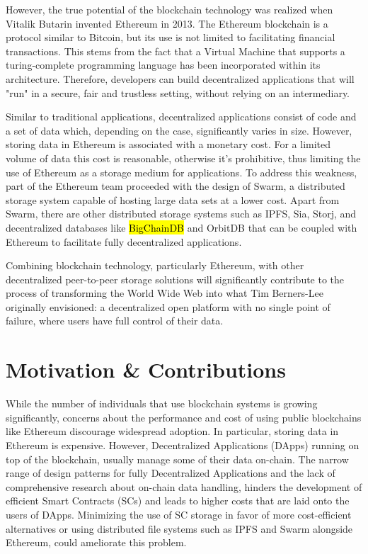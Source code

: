 However, the true potential of the blockchain technology was realized when Vitalik Butarin invented Ethereum in 2013. The Ethereum blockchain is a protocol similar to Bitcoin, but its use is not limited to facilitating financial transactions. This stems from the fact that a Virtual Machine that supports a turing-complete programming language has been incorporated within its architecture. Therefore, developers can build decentralized applications that will "run" in a secure, fair and trustless setting, without relying on an intermediary. 

Similar to traditional applications, decentralized applications consist of code and a set of data which, depending on the case, significantly varies in size. However, storing data in Ethereum is associated with a monetary cost. For a limited volume of data this cost is reasonable, otherwise it's prohibitive, thus limiting the use of Ethereum as a storage medium for applications. To address this weakness, part of the Ethereum team proceeded with the design of Swarm, a distributed storage system capable of hosting large data sets at a lower cost. Apart from Swarm, there are other distributed storage systems such as IPFS, Sia, Storj, and decentralized databases like \hl{BigChainDB} and OrbitDB that can be coupled with Ethereum to facilitate fully decentralized applications. 

Combining blockchain technology, particularly Ethereum, with other decentralized peer-to-peer storage solutions will significantly contribute to the process of transforming the World Wide Web into what Tim Berners-Lee originally envisioned: a decentralized open platform with no single point of failure, where users have full control of their data. 

\section{Motivation \& Contributions}\label{sec:}
While the number of individuals that use blockchain systems is growing significantly, concerns about the performance and cost of using public blockchains like Ethereum \citep{buterin_2014} discourage widespread adoption. In particular, storing data in Ethereum is expensive. However, Decentralized Applications (DApps) running on top of the blockchain, usually manage some of their data on-chain. The narrow range of design patterns for fully Decentralized Applications \citep{wohrer_2021} and the lack of comprehensive research about on-chain data handling, hinders the development of efficient Smart Contracts (SCs) and leads to higher costs that are laid onto the users of DApps. Minimizing the use of SC storage in favor of more cost-efficient alternatives or using distributed file systems such as IPFS \citep{benet_2014} and Swarm \citep{tron_2020} alongside Ethereum, could ameliorate this problem.

